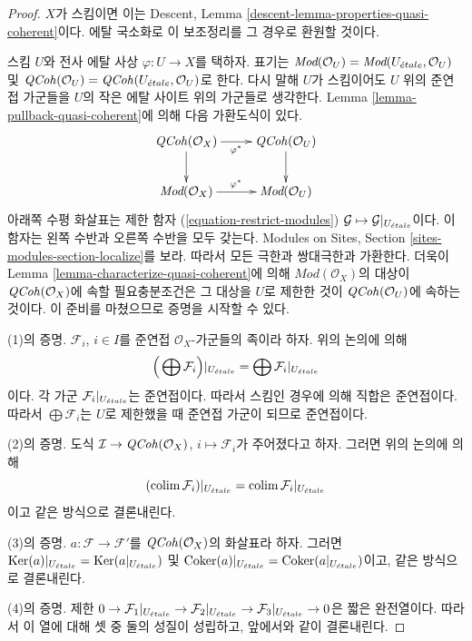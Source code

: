\begin{proof}
$X$가 스킴이면 이는 Descent, Lemma
\ref{descent-lemma-properties-quasi-coherent}이다. 에탈 국소화로 이
보조정리를 그 경우로 환원할 것이다.

\medskip\noindent
스킴 $U$와 전사 에탈 사상 $\varphi : U \to X$를 택하자. 표기는
$\textit{Mod}(\mathcal{O}_U) =
\textit{Mod}(U_{\acute{e}tale}, \mathcal{O}_U)$ 및
$\mathit{QCoh}(\mathcal{O}_U) = \mathit{QCoh}(U_{\acute{e}tale}, \mathcal{O}_U)$로 한다.
다시 말해 $U$가 스킴이어도 $U$ 위의 준연접 가군들을 $U$의 작은 에탈
사이트 위의 가군들로 생각한다. Lemma
\ref{lemma-pullback-quasi-coherent}에 의해 다음 가환도식이 있다.
$$
\xymatrix{
\QCoh(\mathcal{O}_X) \ar[r]_{\varphi^*} \ar[d] &
\QCoh(\mathcal{O}_U) \ar[d] \\
\textit{Mod}(\mathcal{O}_X) \ar[r]^{\varphi^*} &
\textit{Mod}(\mathcal{O}_U)
}
$$
아래쪽 수평 화살표는 제한 함자
(\ref{equation-restrict-modules})
$\mathcal{G} \mapsto \mathcal{G}|_{U_{\acute{e}tale}}$이다. 이 함자는 왼쪽
수반과 오른쪽 수반을 모두 갖는다. Modules on Sites, Section
\ref{sites-modules-section-localize}를 보라. 따라서 모든 극한과
쌍대극한과 가환한다. 더욱이 Lemma
\ref{lemma-characterize-quasi-coherent}에 의해
$\textit{Mod}(\mathcal{O}_X)$의 대상이 $\mathit{QCoh}(\mathcal{O}_X)$에 속할
필요충분조건은 그 대상을 $U$로 제한한 것이
$\mathit{QCoh}(\mathcal{O}_U)$에 속하는 것이다. 이 준비를 마쳤으므로 증명을
시작할 수 있다.

\medskip\noindent
(1)의 증명. $\mathcal{F}_i$, $i \in I$를 준연접
$\mathcal{O}_X$-가군들의 족이라 하자. 위의 논의에 의해
$$
\Big(\bigoplus \mathcal{F}_i\Big)|_{U_{\acute{e}tale}} =
\bigoplus \mathcal{F}_i|_{U_{\acute{e}tale}}
$$
이다. 각 가군 $\mathcal{F}_i|_{U_{\acute{e}tale}}$는 준연접이다. 따라서 스킴인
경우에 의해 직합은 준연접이다. 따라서 $\bigoplus \mathcal{F}_i$는
$U$로 제한했을 때 준연접 가군이 되므로 준연접이다.

\medskip\noindent
(2)의 증명. 도식 $\mathcal{I} \to \mathit{QCoh}(\mathcal{O}_X)$,
$i \mapsto \mathcal{F}_i$가 주어졌다고 하자. 그러면 위의 논의에 의해
$$
(\mathop{\mathrm{colim}}\nolimits \mathcal{F}_i)|_{U_{\acute{e}tale}} = \mathop{\mathrm{colim}}\nolimits \mathcal{F}_i|_{U_{\acute{e}tale}}
$$
이고 같은 방식으로 결론내린다.

\medskip\noindent
(3)의 증명. $a : \mathcal{F} \to \mathcal{F}'$를
$\mathit{QCoh}(\mathcal{O}_X)$의 화살표라 하자. 그러면
$\mathop{\mathrm{Ker}}(a)|_{U_{\acute{e}tale}} = \mathop{\mathrm{Ker}}(a|_{U_{\acute{e}tale}})$ 및
$\mathop{\mathrm{Coker}}(a)|_{U_{\acute{e}tale}} = \mathop{\mathrm{Coker}}(a|_{U_{\acute{e}tale}})$이고, 같은 방식으로
결론내린다.

\medskip\noindent
(4)의 증명. 제한
$0 \to \mathcal{F}_1|_{U_{\acute{e}tale}} \to \mathcal{F}_2|_{U_{\acute{e}tale}}
\to \mathcal{F}_3|_{U_{\acute{e}tale}} \to 0$은 짧은 완전열이다. 따라서 이 열에
대해 셋 중 둘의 성질이 성립하고, 앞에서와 같이 결론내린다.


\end{proof}
